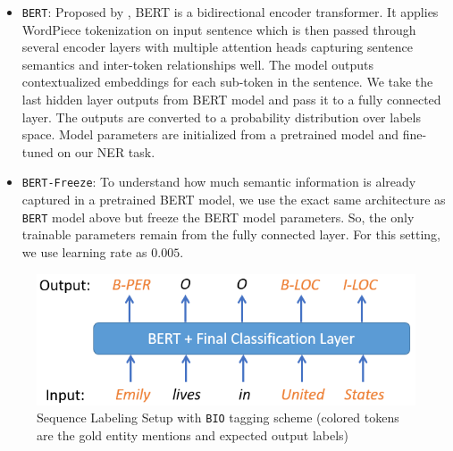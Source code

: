 \begin{itemize}

    \item \texttt{BERT}: Proposed by \cite{devlin2018bert}, BERT is a bidirectional encoder transformer\cite{vaswani2017attention}. It applies WordPiece\cite{wu2016google} tokenization on input sentence which is then passed through several encoder layers with multiple attention heads capturing sentence semantics and inter-token relationships well. The model outputs contextualized embeddings for each sub-token in the sentence. We take the last hidden layer outputs from BERT model and pass it to a fully connected layer. The outputs are converted to a probability distribution over labels space. Model parameters are initialized from a pretrained model and fine-tuned on our NER task.
    
    
    \item \texttt{BERT-Freeze}: To understand how much semantic information is already captured in a pretrained BERT model, we use the exact same architecture as \texttt{BERT} model above but freeze the BERT model parameters. So, the only trainable parameters remain from the fully connected layer. For this setting, we use learning rate as $0.005$.
\end{itemize}


\begin{figure}
    \centering
    \includegraphics[scale=0.8]{sequence_labeling}
    \caption{Sequence Labeling Setup with \texttt{BIO} tagging scheme (colored tokens are the gold entity mentions and expected output labels)}
    \label{fig:sequence_labeling}
\end{figure}

